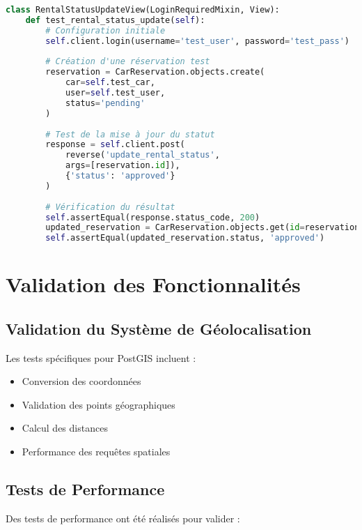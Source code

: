 \begin{lstlisting}[language=Python, caption=Exemple de test automatisé]
class RentalStatusUpdateView(LoginRequiredMixin, View):
    def test_rental_status_update(self):
        # Configuration initiale
        self.client.login(username='test_user', password='test_pass')
        
        # Création d'une réservation test
        reservation = CarReservation.objects.create(
            car=self.test_car,
            user=self.test_user,
            status='pending'
        )
        
        # Test de la mise à jour du statut
        response = self.client.post(
            reverse('update_rental_status', 
            args=[reservation.id]),
            {'status': 'approved'}
        )
        
        # Vérification du résultat
        self.assertEqual(response.status_code, 200)
        updated_reservation = CarReservation.objects.get(id=reservation.id)
        self.assertEqual(updated_reservation.status, 'approved')
\end{lstlisting}

\section{Validation des Fonctionnalités}

\subsection{Validation du Système de Géolocalisation}
Les tests spécifiques pour PostGIS incluent :

\begin{itemize}
    \item Conversion des coordonnées
    \item Validation des points géographiques
    \item Calcul des distances
    \item Performance des requêtes spatiales
\end{itemize}

\subsection{Tests de Performance}
Des tests de performance ont été réalisés pour valider :

